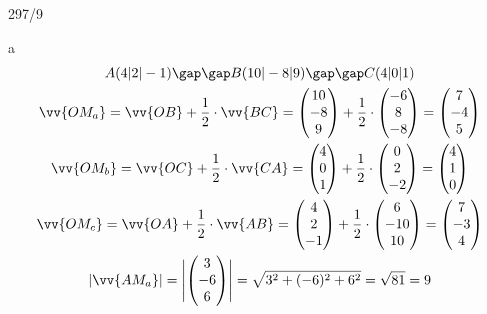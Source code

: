 \begin{exercise}{297/9}
  \item [a]
  \begin{gather*}
    A(4|2|-1) \gap\gap B(10|-8|9) \gap\gap C(4|0|1) \\
    \vv{OM_a} = \vv{OB} + \frac{1}{2} \cdot \vv{BC} = \begin{pmatrix}10 \\ -8 \\ 9\end{pmatrix} + \frac{1}{2} \cdot \begin{pmatrix}-6 \\ 8 \\ -8\end{pmatrix} = \begin{pmatrix}7 \\ -4 \\ 5\end{pmatrix} \\
    \vv{OM_b} = \vv{OC} + \frac{1}{2} \cdot \vv{CA} = \begin{pmatrix}4 \\ 0 \\ 1\end{pmatrix} + \frac{1}{2} \cdot \begin{pmatrix}0 \\ 2 \\ -2\end{pmatrix} = \begin{pmatrix}4 \\ 1 \\ 0\end{pmatrix} \\
    \vv{OM_c} = \vv{OA} + \frac{1}{2} \cdot \vv{AB} = \begin{pmatrix}4 \\ 2 \\ -1\end{pmatrix} + \frac{1}{2} \cdot \begin{pmatrix}6 \\ -10 \\ 10\end{pmatrix} = \begin{pmatrix}7 \\ -3 \\ 4\end{pmatrix} \\
    |\vv{AM_a}| = \Biggl|\begin{pmatrix}3 \\ -6 \\ 6\end{pmatrix}\Biggr| = \sqrt{3^2 + (-6)^2 + 6^2} = \sqrt{81} = 9 \\

\end{gather*}
\end{exercise}

